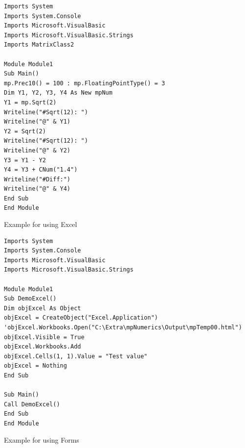 \begin{lstlisting}
Imports System
Imports System.Console
Imports Microsoft.VisualBasic
Imports Microsoft.VisualBasic.Strings
Imports MatrixClass2

Module Module1
Sub Main()
mp.Prec10() = 100 : mp.FloatingPointType() = 3
Dim Y1, Y2, Y3, Y4 As New mpNum
Y1 = mp.Sqrt(2)
Writeline("#Sqrt(12): ")
Writeline("@" & Y1)
Y2 = Sqrt(2)
Writeline("#Sqrt(12): ")
Writeline("@" & Y2)
Y3 = Y1 - Y2
Y4 = Y3 + CNum("1.4")
Writeline("#Diff:")
Writeline("@" & Y4)
End Sub
End Module
\end{lstlisting}


\vpara
Example for using Excel

\begin{lstlisting}
Imports System
Imports System.Console
Imports Microsoft.VisualBasic
Imports Microsoft.VisualBasic.Strings

Module Module1
Sub DemoExcel()
Dim objExcel As Object
objExcel = CreateObject("Excel.Application")
'objExcel.Workbooks.Open("C:\Extra\mpNumerics\Output\mpTemp00.html")
objExcel.Visible = True
objExcel.Workbooks.Add
objExcel.Cells(1, 1).Value = "Test value"
objExcel = Nothing
End Sub

Sub Main()
Call DemoExcel()
End Sub
End Module
\end{lstlisting}



\newpage
Example for using Forms

